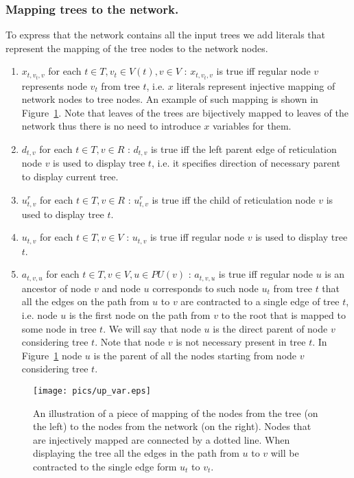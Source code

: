 \documentclass[runningheads, envcountsame, a4paper]{llncs}
\begin{document}
\subsubsection{Mapping trees to the network.}

To express that the network contains all the input trees we add literals that represent the mapping of the tree nodes to 
the network nodes.

\begin{enumerate}

\item $x_{t,v_t,v}$ for each $t \in T, v_t \in V(t), v \in V$ :
$x_{t,v_t,v}$ is true iff regular node $v$ represents node $v_t$ from tree $t$, i.e. $x$ literals represent injective 
mapping of network nodes to tree nodes. An example of such mapping is shown in Figure~\ref{mapping-example}.
Note that leaves of the trees are bijectively mapped to leaves of the network thus there is no need to introduce $x$ variables for them.

\item $d_{t,v}$ for each $t \in T, v \in R$ :
$d_{t,v}$ is true iff the left parent edge of reticulation node $v$ is used to display tree $t$,
 i.e. it specifies direction of necessary parent to display current tree.

\item $u^r_{t,v}$ for each $t \in T, v \in R$ :
$u^r_{t,v}$ is true iff the child of reticulation node $v$ is used to display tree $t$.

\item $u_{t,v}$ for each $t \in T, v \in V$ :
$u_{t,v}$ is true iff regular node $v$ is used to display tree $t$.

\item $a_{t,v,u}$ for each $t \in T, v \in V, u \in PU(v)$ :
$a_{t,v,u}$ is true iff regular node $u$ is an ancestor of node $v$ and node $u$ corresponds to such node $u_t$ 
from tree $t$ that all the edges on the path from $u$ to $v$ are contracted to a single edge of tree $t$, i.e. node
$u$ is the first node on the path from $v$ to the root that is mapped to some node in tree $t$.
We will say that node $u$ is the direct parent of node $v$ considering tree $t$. Note that node $v$ is not necessary present in tree $t$.
In Figure~\ref{mapping-example} node $u$ is the parent of all the nodes starting from node $v$ considering tree $t$.

\end{enumerate}

\begin{figure}[t]
  \centering
  \texttt{[image: pics/up\_var.eps]}
  \caption{An illustration of a piece of mapping of the nodes from the tree (on the left) to the nodes from the network (on the right). 
  Nodes that are injectively mapped are connected by a dotted line. When displaying the tree all the edges in the path from $u$ to $v$
  will be contracted to the single edge form $u_t$ to $v_t$.}
  \label{mapping-example}
\end{figure}
\end{document}

